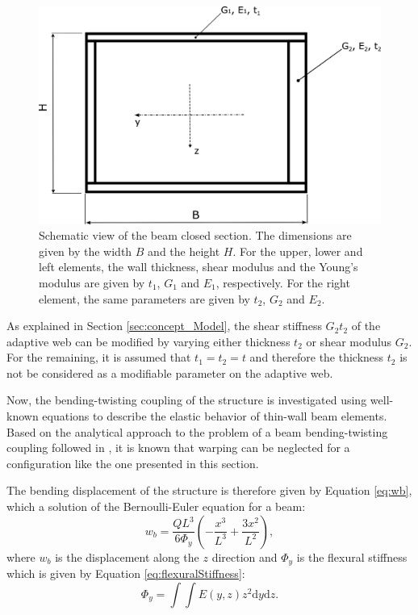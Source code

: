  \begin{figure}[!htpb]
    \centering
    \includegraphics[width=0.7 \textwidth]{figures/model/analyticalBox2}
    \caption[Schematic view of the beam closed section]{Schematic view of the beam closed section. The dimensions are given by the width $B$ and the height $H$. For the upper, lower and left elements, the wall thickness, shear modulus and the Young's modulus are given by $t_1$, $G_1$ and $E_1$, respectively. For the right element, the same parameters are given by $t_2$, $G_2$ and $E_2$.}\label{fig:analyticalBox}
  \end{figure}

  As explained in Section \ref{sec:concept_Model}, the shear stiffness $G_2 t_2$ of the adaptive web can be modified by varying either thickness $t_2$ or shear modulus $G_2$. For the remaining, it is assumed that $t_1 = t_2 = t$ and therefore the thickness $t_2$ is not be considered as a modifiable parameter on the adaptive web.

  Now, the bending-twisting coupling of the structure is investigated using well-known equations to describe the elastic behavior of thin-wall beam elements. Based on the analytical approach to the problem of a beam bending-twisting coupling followed in \cite{Raither2013a}, it is known that warping can be neglected for a configuration like the one presented in this section.

  The bending displacement of the structure is therefore given by Equation \ref{eq:wb}, which a solution of the Bernoulli-Euler equation for a beam:
  \begin{equation}\label{eq:wb}
    w_b = \frac{Q L^3}{6 \Phi_y} \left( -\frac{x^3}{L^3} + \frac{3 x^2}{L^2} \right),
  \end{equation}
  where $w_b$ is the displacement along the $z$ direction and $\Phi_y$ is the flexural stiffness which is given by Equation \ref{eq:flexuralStiffness}:
  \begin{equation}\label{eq:flexuralStiffness}
    \Phi_y = \int \int E(y,z) z^2 \mathrm{d}y \mathrm{d}z.
  \end{equation}

